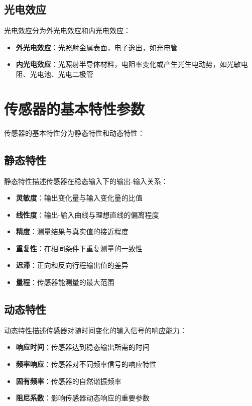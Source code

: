 \documentclass[12pt,UTF8]{ctexbook}
\begin{document}
\subsection{光电效应}

光电效应分为外光电效应和内光电效应：

\begin{itemize}[leftmargin=2cm]
	\item \textbf{外光电效应}：光照射金属表面，电子逸出，如光电管
	\item \textbf{内光电效应}：光照射半导体材料，电阻率变化或产生光生电动势，如光敏电阻、光电池、光电二极管
\end{itemize}

\section{传感器的基本特性参数}

传感器的基本特性分为静态特性和动态特性：

\subsection{静态特性}

静态特性描述传感器在稳态输入下的输出-输入关系：

\begin{itemize}[leftmargin=2cm]
	\item \textbf{灵敏度}：输出变化量与输入变化量的比值
	\item \textbf{线性度}：输出-输入曲线与理想直线的偏离程度
	\item \textbf{精度}：测量结果与真实值的接近程度
	\item \textbf{重复性}：在相同条件下重复测量的一致性
	\item \textbf{迟滞}：正向和反向行程输出值的差异
	\item \textbf{量程}：传感器能测量的最大范围
\end{itemize}

\subsection{动态特性}

动态特性描述传感器对随时间变化的输入信号的响应能力：

\begin{itemize}[leftmargin=2cm]
	\item \textbf{响应时间}：传感器达到稳态输出所需的时间
	\item \textbf{频率响应}：传感器对不同频率信号的响应特性
	\item \textbf{固有频率}：传感器的自然谐振频率
	\item \textbf{阻尼系数}：影响传感器动态响应的重要参数
\end{itemize}
\end{document}
